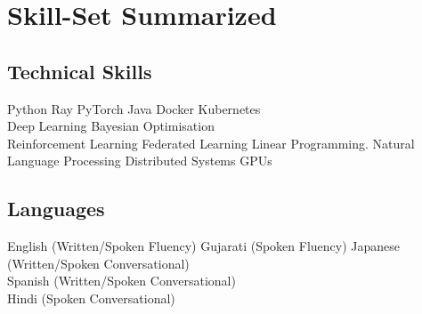 \documentclass[a4paper]{deedy-resume} %
\begin{document}
\section{Skill-Set Summarized}

\begin{minipage}[t]{0.45\textwidth}

\subsection{Technical Skills}
Python \textbullet{} Ray \textbullet{} PyTorch \textbullet{} Java \textbullet{} Docker \textbullet{} Kubernetes  \\  \textbullet{} Deep Learning \textbullet{} Bayesian Optimisation \textbullet{} \\ Reinforcement Learning \textbullet{} Federated Learning \textbullet{} Linear Programming. \textbullet{} Natural Language Processing \textbullet{} Distributed Systems \textbullet{} GPUs

\end{minipage}
\begin{minipage}[t]{10\textwidth}
\end{minipage}
\begin{minipage}[t]{0.45\textwidth}
\subsection{Languages}
English (Written/Spoken Fluency) \textbullet{} Gujarati (Spoken Fluency) \textbullet{} Japanese (Written/Spoken Conversational) \textbullet{} \\  Spanish (Written/Spoken Conversational)  \textbullet{} \\  Hindi (Spoken Conversational)

\end{minipage}
\end{document}
